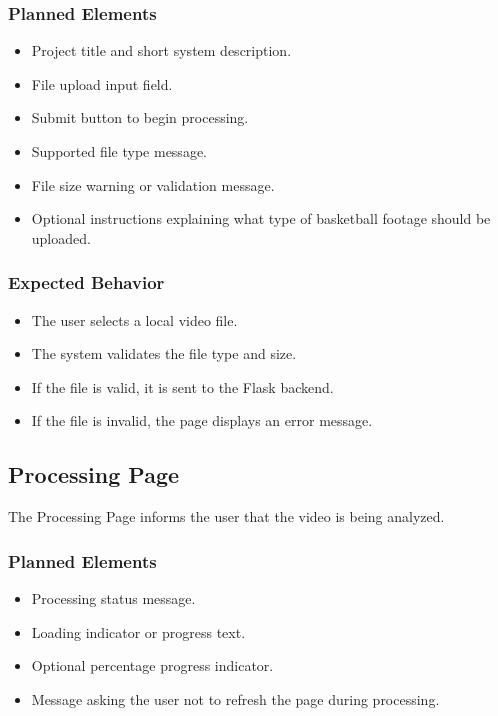 \documentclass[12pt]{article}
\begin{document}
\subsubsection*{Planned Elements}
\begin{itemize}[noitemsep]
    \item Project title and short system description.
    \item File upload input field.
    \item Submit button to begin processing.
    \item Supported file type message.
    \item File size warning or validation message.
    \item Optional instructions explaining what type of basketball footage should be uploaded.
\end{itemize}

\subsubsection*{Expected Behavior}
\begin{itemize}[noitemsep]
    \item The user selects a local video file.
    \item The system validates the file type and size.
    \item If the file is valid, it is sent to the Flask backend.
    \item If the file is invalid, the page displays an error message.
\end{itemize}

\subsection{Processing Page}
The Processing Page informs the user that the video is being analyzed.

\subsubsection*{Planned Elements}
\begin{itemize}[noitemsep]
    \item Processing status message.
    \item Loading indicator or progress text.
    \item Optional percentage progress indicator.
    \item Message asking the user not to refresh the page during processing.
\end{itemize}
\end{document}
